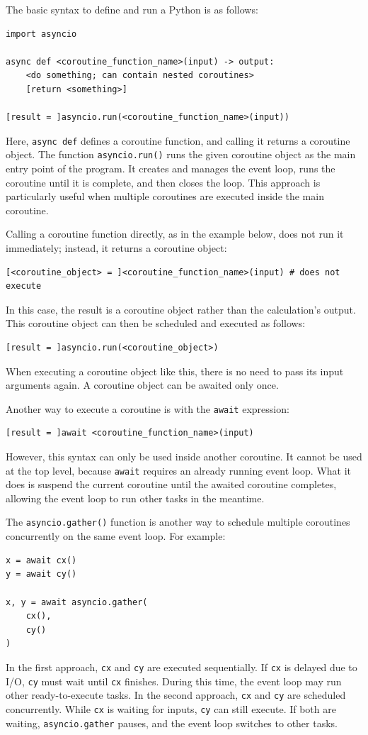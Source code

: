 The basic syntax to define and run a Python  is as follows:
\begin{lstlisting}
import asyncio

async def <coroutine_function_name>(input) -> output:
    <do something; can contain nested coroutines>
    [return <something>]
    
[result = ]asyncio.run(<coroutine_function_name>(input))
\end{lstlisting}
Here, \texttt{async def} defines a coroutine function, and calling it returns a coroutine object. The function \texttt{asyncio.run()} runs the given coroutine object as the main entry point of the program. It creates and manages the event loop, runs the coroutine until it is complete, and then closes the loop. This approach is particularly useful when multiple coroutines are executed inside the main coroutine.

Calling a coroutine function directly, as in the example below, does not run it immediately; instead, it returns a coroutine object:
\begin{lstlisting}
[<coroutine_object> = ]<coroutine_function_name>(input) # does not execute
\end{lstlisting}
In this case, the result is a coroutine object rather than the calculation’s output. This coroutine object can then be scheduled and executed as follows:
\begin{lstlisting}
[result = ]asyncio.run(<coroutine_object>)
\end{lstlisting}
When executing a coroutine object like this, there is no need to pass its input arguments again. A coroutine object can be awaited only once.

Another way to execute a coroutine is with the \verb|await| expression:
\begin{lstlisting}
[result = ]await <coroutine_function_name>(input)
\end{lstlisting}
However, this syntax can only be used inside another coroutine. It cannot be used at the top level, because \verb|await| requires an already running event loop. What it does is suspend the current coroutine until the awaited coroutine completes, allowing the event loop to run other tasks in the meantime.

The \texttt{asyncio.gather()} function is another way to schedule multiple coroutines concurrently on the same event loop. For example:
\begin{lstlisting}
x = await cx()
y = await cy()

x, y = await asyncio.gather(
    cx(), 
    cy()
)
\end{lstlisting}
In the first approach, \verb|cx| and \verb|cy| are executed sequentially. If \verb|cx| is delayed due to I/O, \verb|cy| must wait until \verb|cx| finishes. During this time, the event loop may run other ready-to-execute tasks. In the second approach, \verb|cx| and \verb|cy| are scheduled concurrently. While \verb|cx| is waiting for inputs, \verb|cy| can still execute. If both are waiting, \verb|asyncio.gather| pauses, and the event loop switches to other tasks.

